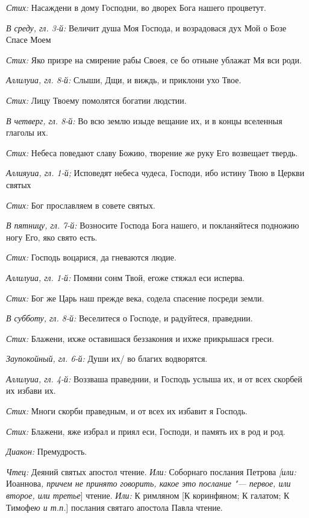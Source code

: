 \begin{mymulticols}
{\itshape Стих:} Насаждени в дому Господни, во дворех Бога нашего процветут.

{\itshape В среду, гл. 3-й:} Величит душа Моя Господа, и возрадовася дух Мой о Бозе Спасе Моем

{\itshape Стих:} Яко призре на смирение рабы Своея, се бо отныне ублажат Мя вси роди.

{\itshape Аллилуиа, гл. 8-й:} Слыши, Дщи, и виждь, и приклони ухо Твое.

{\itshape Стих:} Лицу Твоему помолятся богатии людстии.

{\itshape В четверг, гл. 8-й:} Во всю землю изыде вещание их, и в концы вселенныя глаголы их.

{\itshape Стих:} Небеса поведают славу Божию, творение же руку Его возвещает твердь.

{\itshape Аллияуиа, гл. 1-й;} Исповедят небеса чудеса, Господи, ибо истину Твою в Церкви святых

{\itshape Стих:} Бог прославляем в совете святых.

{\itshape В пятницу, гл. 7-й:} Возносите Господа Бога нашего, и покланяйтеся подножию ногу Его, яко свято есть.

{\itshape Стих:} Господь воцарися, да гневаются людие.

{\itshape Аллилуиа, гл. 1-й:} Помяни сонм Твой, егоже стяжал еси исперва.

{\itshape Стих:} Бог же Царь наш прежде века, содела спасение посреди земли. 

{\itshape В субботу, гл. 8-й:} Веселитеся о Господе, и радуйтеся, праведнии.

{\itshape Стих:} Блажени, ихже оставишася беззакония и ихже прикрышася греси.

{\itshape Заупокойный, гл. 6-й:} Души их/ во благих водворятся.

{\itshape Аллилуиа, гл. 4-й:} Воззваша праведнии, и Господь услыша их, и от всех скорбей их избави их.

{\itshape Стих:} Многи скорби праведным, и от всех их избавит я Господь.

{\itshape Стих:} Блажени, яже избрал и приял еси, Господи, и память их в род и род.

{\itshape Диакон:} Премудрость.

{\itshape Чтец:} Деяний святых апостол чтение. {\itshape Или:} Соборнаго послания Петрова {\itshape [или:} Иоаннова{\itshape , причем не принято говорить, какое это послание "--- первое, или второе, или третье}] чтение. {\itshape Или:} К римляном [К коринфяном; К галатом; К Тимофе{\itshape ю и т.п.}] послания святаго апостола Павла чтение.


\end{mymulticols}
